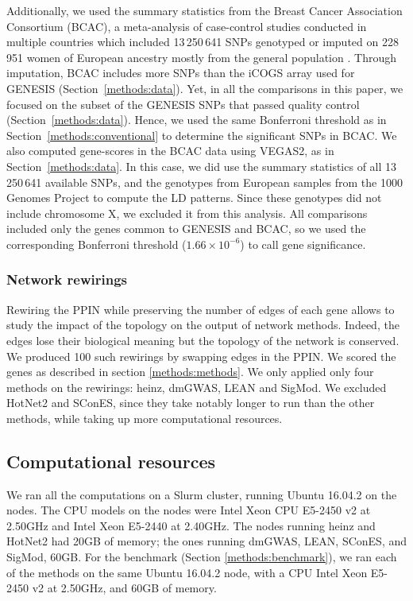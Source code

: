 \documentclass[10pt,letterpaper]{article}
\begin{document}
Additionally, we used the summary statistics from the Breast Cancer Association Consortium (BCAC), a meta-analysis of case-control studies conducted in multiple countries which included 13\,250\,641 SNPs genotyped or imputed on 228\,951 women of European ancestry mostly from the general population \cite{Michailidou2017}. Through imputation, BCAC includes more SNPs than the iCOGS array used for GENESIS (Section~\ref{methods:data}). Yet, in all the comparisons in this paper, we focused on the subset of the GENESIS SNPs that passed quality control (Section~\ref{methods:data}). Hence, we used the same Bonferroni threshold as in Section~\ref{methods:conventional} to determine the significant SNPs in BCAC. We also computed gene-scores in the BCAC data using VEGAS2, as in Section~\ref{methods:data}. In this case, we did use the summary statistics of all 13\,250\,641 available SNPs, and the genotypes from European samples from the 1000 Genomes Project \cite{the_1000_genomes_project_consortium_global_2015} to compute the LD patterns. Since these genotypes did not include chromosome X, we excluded it from this analysis. All comparisons included only the genes common to GENESIS and BCAC, so we used the corresponding Bonferroni threshold ($1.66 \times 10^{-6}$) to call gene significance. 

\subsubsection{Network rewirings}
\label{methods:rewiring}

Rewiring the PPIN while preserving the number of edges of each gene allows to study the impact of the topology on the output of network methods. Indeed, the edges lose their biological meaning but the topology of the network is conserved. We produced 100 such rewirings by swapping edges in the PPIN. We scored the genes as described in section \ref{methods:methods}. We only applied only four methods on the rewirings: heinz, dmGWAS, LEAN and SigMod. We excluded HotNet2 and SConES, since they take notably longer to run than the other methods, while taking up more computational resources. 

\subsection{Computational resources}
\label{methods:computation}

We ran all the computations on a Slurm cluster, running Ubuntu 16.04.2 on the nodes. The CPU models on the nodes were Intel Xeon CPU E5-2450 v2 at 2.50GHz and Intel Xeon E5-2440 at 2.40GHz. The nodes running heinz and HotNet2 had 20GB of memory; the ones running dmGWAS, LEAN, SConES, and SigMod, 60GB. For the benchmark (Section \ref{methods:benchmark}), we ran each of the methods on the same Ubuntu 16.04.2 node, with a CPU Intel Xeon E5-2450 v2 at 2.50GHz, and 60GB of memory.
\end{document}
